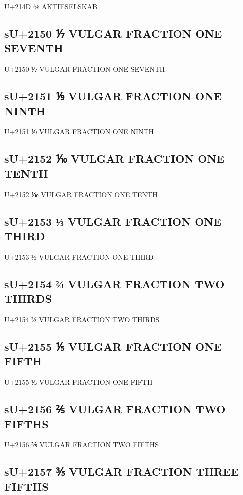 U+214D ⅍ AKTIESELSKAB

\subsection{sU+2150 ⅐ VULGAR FRACTION ONE SEVENTH}

U+2150 ⅐ VULGAR FRACTION ONE SEVENTH

\subsection{sU+2151 ⅑ VULGAR FRACTION ONE NINTH}

U+2151 ⅑ VULGAR FRACTION ONE NINTH

\subsection{sU+2152 ⅒ VULGAR FRACTION ONE TENTH}

U+2152 ⅒ VULGAR FRACTION ONE TENTH

\subsection{sU+2153 ⅓ VULGAR FRACTION ONE THIRD}

U+2153 ⅓ VULGAR FRACTION ONE THIRD

\subsection{sU+2154 ⅔ VULGAR FRACTION TWO THIRDS}

U+2154 ⅔ VULGAR FRACTION TWO THIRDS

\subsection{sU+2155 ⅕ VULGAR FRACTION ONE FIFTH}

U+2155 ⅕ VULGAR FRACTION ONE FIFTH

\subsection{sU+2156 ⅖ VULGAR FRACTION TWO FIFTHS}

U+2156 ⅖ VULGAR FRACTION TWO FIFTHS

\subsection{sU+2157 ⅗ VULGAR FRACTION THREE FIFTHS}

